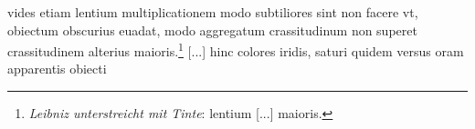 \pend \pstart  [p.~133] [...] vides etiam lentium\protect{} multiplicationem modo subtiliores sint non facere vt, obiectum obscurius euadat, modo aggregatum crassitudinum non superet crassitudinem alterius maioris.\footnote{\textit{Leibniz unterstreicht mit Tinte}: lentium\protect{} [...] maioris.} [...] hinc colores iridis\protect{}, saturi quidem versus oram apparentis obiecti